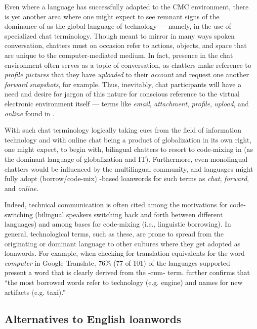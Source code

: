 \documentclass[output=paper
,newtxmath
,modfonts
,nonflat]{langsci/langscibook}
\begin{document}
Even where a language has successfully adapted to the CMC environment, there is yet another area where one might expect to see remnant signs of the dominance of  as the global language of technology — namely, in the use of specialized chat terminology. Though meant to mirror in many ways spoken conversation, chatters must on occasion refer to actions, objects, and space that are unique to the computer-mediated medium. In fact, presence in the chat environment often serves as a topic of conversation, as chatters make reference to \textit{profile pictures} that they have \textit{uploaded} to their \textit{account} and request one another \textit{forward} \textit{snapshots}, for example. Thus, inevitably, chat participants will have a need and desire for jargon of this nature for conscious reference to the virtual electronic environment itself — terms like \textit{email}, \textit{attachment}, \textit{profile}, \textit{upload}, and \textit{online} found in . 

With such chat terminology logically taking cues from the field of information technology and with online chat being a product of globalization in its own right, one might expect, to begin with, bilingual chatters to resort to code-mixing in  (as the dominant language of globalization and IT). Furthermore, even monolingual chatters would be influenced by the multilingual community, and languages might fully adopt (borrow/code-mix) -based loanwords for such terms as \textit{chat}, \textit{forward}, and \textit{online}.

Indeed, technical communication is often cited among the motivations for code-switching (bilingual speakers switching back and forth between different languages) and among bases for code-mixing (i.e., linguistic borrowing). In general, technological terms, such as these, are prone to spread from the originating or dominant language to other cultures where they get adopted as loanwords. For example, when checking for translation equivalents for the word \textit{computer} in Google Translate, 76\% (77 of 101) of the languages supported present a word that is clearly derived from the -cum- term. \citet{daulton2012} further confirms that “the most borrowed words refer to technology (e.g. engine) and names for new artifacts (e.g. taxi).”

\subsection{Alternatives to English loanwords}
\end{document}

